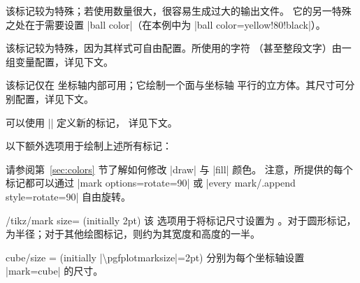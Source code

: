 \begin{longdescription}
        该标记较为特殊；若使用数量很大，很容易生成过大的输出文件。
        它的另一特殊之处在于需要设置 |ball color|（在本例中为
        |ball color=yellow!80!black|）。

    \item[mark=text] 

        该标记较为特殊，因为其样式可自由配置。所使用的字符
        （甚至整段文字）由一组变量配置，详见下文。

    \item[mark=cube] 

        该标记仅在 \PGFPlots{} 坐标轴内部可用；它绘制一个面与坐标轴
        平行的立方体。其尺寸可分别配置，详见下文。

    \item[mark=cube*] 
    \item[用户自定义] 可以使用 |\pgfdeclareplotmark| 定义新的标记，
        详见下文。
\end{longdescription}
%
以下额外选项用于绘制上述所有标记：
%
\begin{codeexample}
\draw [
    gray,
    thin,
    mark options={
        scale=2,fill=yellow!80!black,draw=black,
    },
]
\end{codeexample}
%
请参阅第~\ref{sec:colors} 节了解如何修改 |draw| 与 |fill| 颜色。
注意，所提供的每个标记都可以通过 |mark options={rotate=90}| 或
|every mark/.append style={rotate=90}| 自由旋转。

\begin{key}{/tikz/mark size= (initially 2pt)}
    该 \Tikz{} 选项用于将标记尺寸设置为 。对于圆形标记，
     为半径；对于其他绘图标记，则约为其宽度和高度的一半。
\end{key}

\begin{pgfplotsxykey}{cube/size \x= (initially |\textbackslash pgfplotmarksize|=2pt)}
    分别为每个坐标轴设置 |mark=cube| 的尺寸。
\end{pgfplotsxykey}

